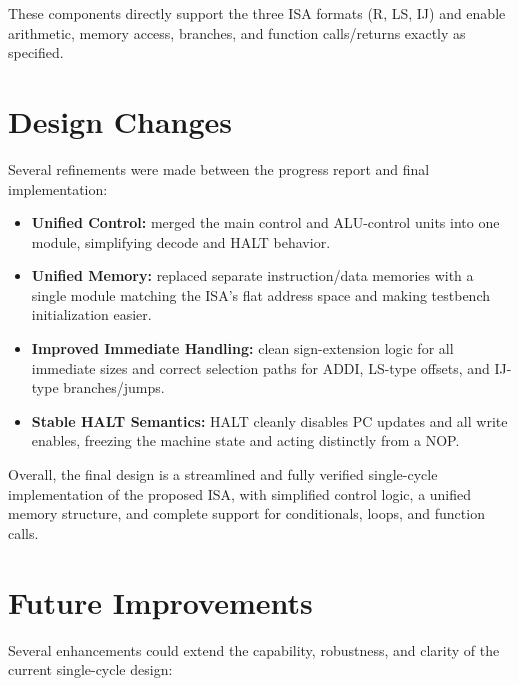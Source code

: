 \documentclass[12pt]{report}
\begin{document}
These components directly support the three ISA formats (R, LS, IJ) and enable
arithmetic, memory access, branches, and function calls/returns exactly as
specified.

\section{Design Changes}

Several refinements were made between the progress report and final
implementation:

\begin{itemize}
    \item \textbf{Unified Control:} merged the main control and ALU-control
          units into one module, simplifying decode and HALT behavior.
    \item \textbf{Unified Memory:} replaced separate instruction/data memories
          with a single module matching the ISA’s flat address space and making
          testbench initialization easier.
    \item \textbf{Improved Immediate Handling:} clean sign-extension logic for
          all immediate sizes and correct selection paths for ADDI, LS-type
          offsets, and IJ-type branches/jumps.
    \item \textbf{Stable HALT Semantics:} HALT cleanly disables PC updates and
          all write enables, freezing the machine state and acting distinctly from a NOP.
\end{itemize}

Overall, the final design is a streamlined and fully verified single-cycle
implementation of the proposed ISA, with simplified control logic, a unified
memory structure, and complete support for conditionals, loops, and
function calls.

\section{Future Improvements}

Several enhancements could extend the capability, robustness, and clarity of
the current single-cycle design:
\end{document}

